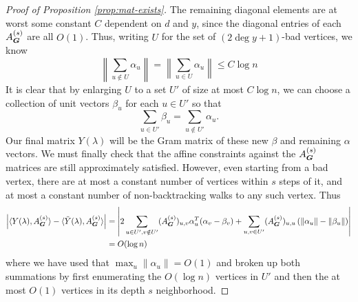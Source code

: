 \begin{proof}[Proof of Proposition \ref{prop:mat-exists}]
    The remaining diagonal elements are at worst some constant $C$ dependent on $d$ and $y$, since the diagonal entries of each $A^{(s)}_{\boldsymbol{G}}$ are all $O(1)$. Thus, writing $U$ for the set of $(2\deg y + 1)$-bad vertices, we know
    $$
        \left\|\sum_{u \notin U} \alpha_u \right\| = \left\|\sum_{u\in U} \alpha_u \right\| \le C\log n
    $$
    It is clear that by enlarging $U$ to a set $U'$ of size at most $C\log n$, we can choose a collection of unit vectors $\beta_u$ for each $u \in U'$ so that $$
        \sum_{u \in U'} \beta_u = \sum_{u\notin U'} \alpha_u. 
    $$
    Our final matrix $Y(\lambda)$ will be the Gram matrix of these new $\beta$ and remaining $\alpha$ vectors. We must finally check that the affine constraints against the $A^{(s)}_{\boldsymbol{G}}$ matrices are still approximately satisfied. However, even starting from a bad vertex, there are at most a constant number of vertices within $s$ steps of it, and at most a constant number of non-backtracking walks to any such vertex. Thus
    \begin{align*}
        \left|\langle Y(\lambda),A^{(s)}_{\boldsymbol{G}} \rangle - \langle \tilde Y(\lambda),A^{(s)}_{\boldsymbol{G}} \rangle \right| &= \left| 2\sum_{u\in U',v\notin U'} (A^{(s)}_{\boldsymbol{G}})_{u,v}\alpha_u^T(\alpha_v - \beta_v) + \sum_{u,v\in U'} (A^{(s)}_{\boldsymbol{G}})_{u,u}\left(\|\alpha_u\| - \|\beta_u\|\right)\right| \\
        &= O(\log n)
    \end{align*}
    where we have used that $\max_u \|\alpha_u\| = O(1)$ and broken up both summations by first enumerating the $O(\log n)$ vertices in $U'$ and then the at most $O(1)$ vertices in its depth $s$ neighborhood.
\end{proof}

